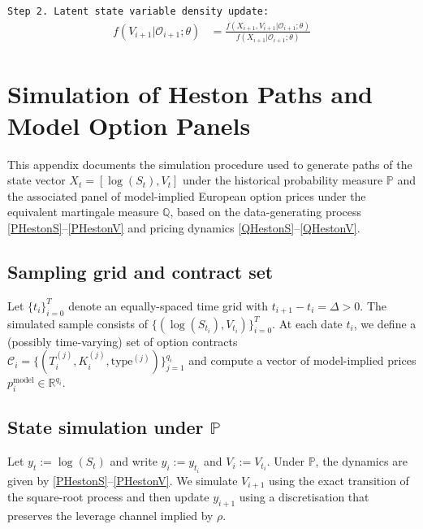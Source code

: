\documentclass[11pt,a4paper,notitlepage]{article}
\numberwithin{equation}{section}
\begin{document}
\texttt{Step 2. Latent state variable density update:}\vspace{-5pt}
\begin{align}
f(V_{i+1}|\mathcal{O}_{i+1}; \theta) &= \frac{f(X_{i+1},V_{i+1}|\mathcal{O}_{i+1}; \theta)}{f(X_{i+1}|\mathcal{O}_{i+1}; \theta)} \label{SamplingDensityTheo}
\end{align}
%

\newpage
\appendix
\section{Simulation of Heston Paths and Model Option Panels}
\label{app:sim_heston}

This appendix documents the simulation procedure used to generate paths of the state vector
$X_t=[\log(S_t),V_t]$ under the historical probability measure $\mathbb{P}$ and the associated
panel of model-implied European option prices under the equivalent martingale measure $\mathbb{Q}$,
based on the data-generating process \eqref{PHestonS}--\eqref{PHestonV} and pricing dynamics
\eqref{QHestonS}--\eqref{QHestonV}.

\subsection{Sampling grid and contract set}
Let $\{t_i\}_{i=0}^T$ denote an equally-spaced time grid with $t_{i+1}-t_i=\Delta>0$.
The simulated sample consists of $\{(\log(S_{t_i}),V_{t_i})\}_{i=0}^T$.
At each date $t_i$, we define a (possibly time-varying) set of option contracts
$\mathcal{C}_i=\{(T_i^{(j)},K_i^{(j)},\mathrm{type}^{(j)})\}_{j=1}^{q_i}$ and compute a vector of
model-implied prices $p_i^{\mathrm{model}}\in\mathbb{R}^{q_i}$.

\subsection{State simulation under $\mathbb{P}$}
Let $y_t:=\log(S_t)$ and write $y_i:=y_{t_i}$ and $V_i:=V_{t_i}$. Under $\mathbb{P}$,
the dynamics are given by \eqref{PHestonS}--\eqref{PHestonV}.
We simulate $V_{i+1}$ using the exact transition of the square-root process and then update $y_{i+1}$
using a discretisation that preserves the leverage channel implied by $\rho$.
\end{document}
